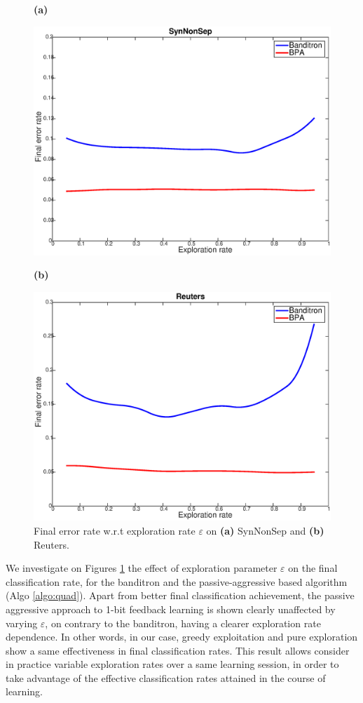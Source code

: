 \documentclass[preprint,12pt,authoryear]{elsarticle}
\begin{document}
\begin{figure}[htp]
	\centerline{\bf (a)}
	\centerline{\includegraphics[width=.9\linewidth]{figs/SynNonSep_gamma.eps}}
	\centerline{\bf (b)}
	\centerline{\includegraphics[width=.9\linewidth]{figs/Reuters_gamma.eps}}
	\caption{Final error rate w.r.t exploration rate $\varepsilon$ on {\bf(a)} SynNonSep and {\bf(b)} Reuters. }
	\label{pic:BPASNSerr}

	
\end{figure}

We investigate on Figures \ref{pic:BPASNSerr} %
the effect of exploration parameter $\varepsilon$ on the final classification rate, for the banditron and the passive-aggressive based algorithm (Algo \ref{algo:quad}). Apart from better final classification achievement, the passive aggressive approach to 1-bit feedback learning is shown clearly unaffected by varying $\varepsilon$, on contrary to the banditron, having a clearer  exploration rate dependence. In other words, in our case, greedy exploitation and pure exploration show a same effectiveness in final classification rates. This result allows consider in practice variable exploration rates over a same learning session, in order to take advantage of the effective classification rates attained in the course of learning. 
\end{document}
